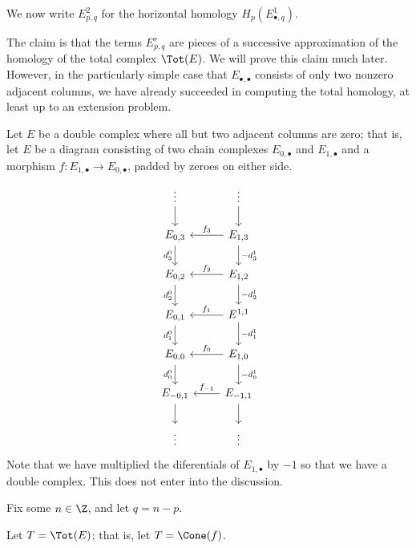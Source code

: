 \documentclass[main.tex]{subfiles}
\begin{document}
We now write $E^{2}_{p,q}$ for the horizontal homology $H_{p}(E^{1}_{\bullet, q})$.

The claim is that the terms $E^{r}_{p,q}$ are pieces of a successive approximation of the homology of the total complex $\Tot(E)$. We will prove this claim much later. However, in the particularly simple case that $E_{\bullet,\bullet}$ consists of only two nonzero adjacent columns, we have already succeeded in computing the total homology, at least up to an extension problem.
\begin{example}
  \label{eg:cone_spectral_sequence}
  Let $E$ be a double complex where all but two adjacent columns are zero; that is, let $E$ be a diagram consisting of two chain complexes $E_{0,\bullet}$ and $E_{1, \bullet}$ and a morphism $f\colon E_{1, \bullet} \to E_{0, \bullet}$, padded by zeroes on either side.
  \begin{equation*}
    \begin{tikzcd}
      \vdots
      \arrow[d]
      & \vdots
      \arrow[d]
      \\
      E_{0,3}
      \arrow[d, swap, "d^{0}_{3}"]
      & E_{1,3}
      \arrow[l, swap, "f_{3}"]
      \arrow[d, "-d^{1}_{3}"]
      \\
      E_{0,2}
      \arrow[d, swap, "d^{0}_{2}"]
      & E_{1,2}
      \arrow[l, swap, "f_{2}"]
      \arrow[d, "-d^{1}_{2}"]
      \\
      E_{0,1}
      \arrow[d, swap, "d^{0}_{1}"]
      & E^{1,1}
      \arrow[l, swap, "f_{1}"]
      \arrow[d, "-d^{1}_{1}"]
      \\
      E_{0,0}
      \arrow[d, swap, "d^{0}_{0}"]
      & E_{1,0}
      \arrow[d, "-d^{1}_{0}"]
      \arrow[l, swap, "f_{0}"]
      \\
      E_{-0,1}
      \arrow[d]
      & E_{-1,1}
      \arrow[l, swap, "f_{-1}"]
      \arrow[d]
      \\
      \vdots
      & \vdots
    \end{tikzcd}
  \end{equation*}
  Note that we have multiplied the diferentials of $E_{1, \bullet}$ by $-1$ so that we have a double complex. This does not enter into the discussion.

  Fix some $n \in \Z$, and let $q = n - p$.

  Let $T = \Tot(E)$; that is, let $T = \Cone(f)$.


\end{example}
\end{document}
